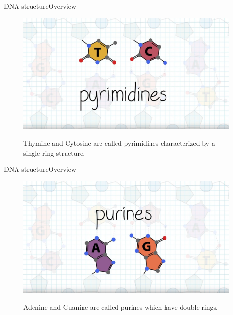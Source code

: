 \documentclass[10pt]{beamer}
\begin{document}
{%
\begin{frame}{DNA structure}{Overview}
	\begin{figure}[]
		\centering
		\includegraphics[width=\textwidth,height=0.7\textheight,keepaspectratio]{img/introduction/dna23.jpg}
		\label{img:mot2}
		\caption{Thymine and Cytosine are called pyrimidines characterized by a single ring structure.}
	\end{figure}
\end{frame}

\begin{frame}{DNA structure}{Overview}
	\begin{figure}[]
		\centering
		\includegraphics[width=\textwidth,height=0.7\textheight,keepaspectratio]{img/introduction/dna24.jpg}
		\label{img:mot2}
		\caption{Adenine and Guanine are called purines which have double rings.}
	\end{figure}
\end{frame}


}
\end{document}
